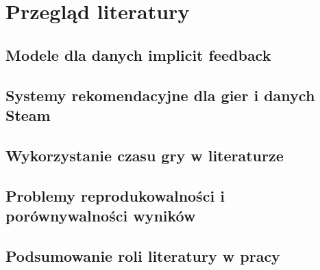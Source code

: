 \chapter{Przegląd literatury}
\section{Modele dla danych implicit feedback}
\section{Systemy rekomendacyjne dla gier i danych Steam}
\section{Wykorzystanie czasu gry w literaturze}
\section{Problemy reprodukowalności i porównywalności wyników}
\section{Podsumowanie roli literatury w pracy}